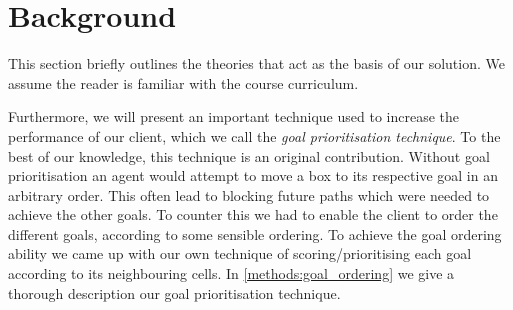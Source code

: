 \section{Background}
\label{sec:background}


This section briefly outlines the theories that act as the basis of our solution. 
We assume the reader is familiar with the course curriculum.



Furthermore, we will present an important technique used to increase the performance of our client, which we call the \emph{goal prioritisation technique}.
To the best of our knowledge, this technique is an original contribution.
Without goal prioritisation an agent would attempt to move a box to its respective goal in an arbitrary order.
This often lead to blocking future paths which were needed to achieve the other goals.
To counter this we had to enable the client to order the different goals, according to some sensible ordering.
To achieve the goal ordering ability we came up with our own technique of scoring/prioritising each goal according to its neighbouring cells.
In \cref{methods:goal_ordering} we give a thorough description our goal prioritisation technique.
